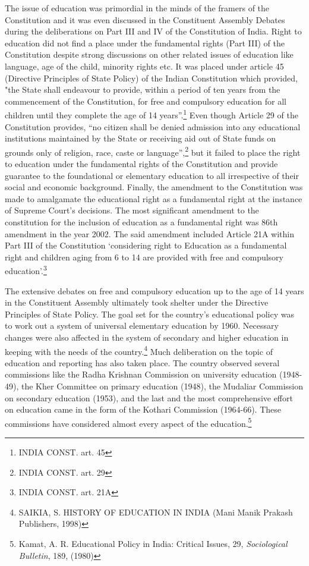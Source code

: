 \begin{multicols}{2}
\noi
The issue of education was primordial in the minds of the framers of the Constitution and it
was even discussed in the Constituent Assembly Debates during the deliberations on Part III
and IV of the Constitution of India. Right to education did not find a place under the
fundamental rights (Part III) of the Constitution despite strong discussions on other related
issues of education like language, age of the child, minority rights etc. It was placed under
article 45 (Directive Principles of State Policy) of the Indian Constitution which provided,
"the State shall endeavour to provide, within a period of ten years from the commencement of
the Constitution, for free and compulsory education for all children until they complete the
age of 14 years”.\footnote{INDIA CONST. art. 45} Even though Article 29 of the Constitution provides, “no citizen shall be
denied admission into any educational institutions maintained by the State or receiving aid
out of State funds on grounds only of religion, race, caste or language”,\footnote{INDIA CONST. art. 29} but it failed to place the right to education under the fundamental rights of the Constitution and provide guarantee
to the foundational or elementary education to all irrespective of their social and economic
background. Finally, the amendment to the Constitution was made to amalgamate the
educational right as a fundamental right at the instance of Supreme Court’s decisions. The
most significant amendment to the constitution for the inclusion of education as a
fundamental right was 86th amendment in the year 2002. The said amendment included
Article 21A within Part III of the Constitution ‘considering right to Education as a
fundamental right and children aging from 6 to 14 are provided with free and compulsory
education’.\footnote{INDIA CONST. art. 21A}


\noi
The extensive debates on free and compulsory education up to the age of 14 years in the
Constituent Assembly ultimately took shelter under the Directive Principles of State Policy.
The goal set for the country’s educational policy was to work out a system of universal
elementary education by 1960. Necessary changes were also affected in the system of
secondary and higher education in keeping with the needs of the country.\footnote{SAIKIA, S. HISTORY OF EDUCATION IN INDIA (Mani Manik Prakash Publishers, 1998)} Much deliberation
on the topic of education and reporting has also taken place. The country observed several
commissions like the Radha Krishnan Commission on university education (1948-49), the
Kher Committee on primary education (1948), the Mudaliar Commission on secondary
education (1953), and the last and the most comprehensive effort on education came in the
form of the Kothari Commission (1964-66). These commissions have considered almost
every aspect of the education.\footnote{Kamat, A. R. Educational Policy in India: Critical Issues, 29, \textit{Sociological Bulletin}, 189, (1980)}


\end{multicols}
